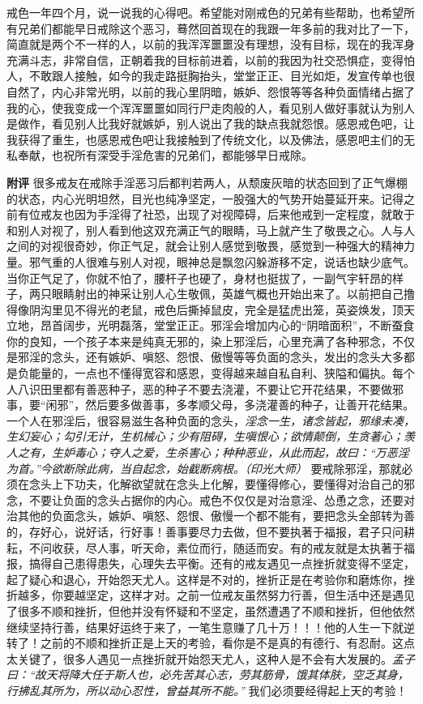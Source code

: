 \begin{case}
    戒色一年四个月，说一说我的心得吧。希望能对刚戒色的兄弟有些帮助，也希望所有兄弟们都能早日戒除这个恶习，蓦然回首现在的我跟一年多前的我对比了一下，简直就是两个不一样的人，以前的我浑浑噩噩没有理想，没有目标，现在的我浑身充满斗志，非常自信，正朝着我的目标前进着，以前的我因为社交恐惧症，变得怕人，不敢跟人接触，如今的我走路挺胸抬头，堂堂正正、目光如炬，发宣传单也很自然了，内心非常光明，以前的我心里阴暗，嫉妒、怨恨等等各种负面情绪占据了我的心，使我变成一个浑浑噩噩如同行尸走肉般的人，看见别人做好事就认为别人是做作，看见别人比我好就嫉妒，别人说出了我的缺点我就怨恨。感恩戒色吧，让我获得了重生，也感恩戒色吧让我接触到了传统文化，以及佛法，感恩吧主们的无私奉献，也祝所有深受手淫危害的兄弟们，都能够早日戒除。

    \textbf{附评} 很多戒友在戒除手淫恶习后都判若两人，从颓废灰暗的状态回到了正气爆棚的状态，内心光明坦然，目光也纯净坚定，一股强大的气势开始蔓延开来。记得之前有位戒友也因为手淫得了社恐，出现了对视障碍，后来他戒到一定程度，就敢于和别人对视了，别人看到他这双充满正气的眼睛，马上就产生了敬畏之心。人与人之间的对视很奇妙，你正气足，就会让别人感觉到敬畏，感觉到一种强大的精神力量。邪气重的人很难与别人对视，眼神总是飘忽闪躲游移不定，说话也缺少底气。当你正气足了，你就不怕了，腰杆子也硬了，身材也挺拔了，一副气宇轩昂的样子，两只眼睛射出的神采让别人心生敬佩，英雄气概也开始出来了。以前把自己撸得像阴沟里见不得光的老鼠，戒色后撕掉鼠皮，完全是猛虎出笼，英姿焕发，顶天立地，昂首阔步，光明磊落，堂堂正正。邪淫会增加内心的“阴暗面积”，不断蚕食你的良知，一个孩子本来是纯真无邪的，染上邪淫后，心里充满了各种邪念，不仅是邪淫的念头，还有嫉妒、嗔怒、怨恨、傲慢等等负面的念头，发出的念头大多都是负能量的，一点也不懂得宽容和感恩，变得越来越自私自利、狭隘和偏执。每个人八识田里都有善恶种子，恶的种子不要去浇灌，不要让它开花结果，不要做邪事，要“闲邪”，然后要多做善事，多孝顺父母，多浇灌善的种子，让善开花结果。一个人在邪淫后，很容易滋生各种负面的念头，\textit{淫念一生，诸念皆起，邪缘未凑，生幻妄心；勾引无计，生机械心；少有阻碍，生嗔恨心；欲情颠倒，生贪著心；羡人之有，生妒毒心；夺人之爱，生杀害心；种种恶业，从此而起，故曰：“万恶淫为首。”今欲断除此病，当自起念，始截断病根。（印光大师）} 要戒除邪淫，那就必须在念头上下功夫，化解欲望就在念头上化解，要懂得修心，要懂得对治自己的邪念，不要让负面的念头占据你的内心。戒色不仅仅是对治意淫、怂恿之念，还要对治其他的负面念头，嫉妒、嗔怒、怨恨、傲慢一个都不能有，要把念头全部转为善的，存好心，说好话，行好事！善事要尽力去做，但不要执著于福报，君子只问耕耘，不问收获，尽人事，听天命，素位而行，随适而安。有的戒友就是太执著于福报，搞得自己患得患失，心理失去平衡。还有的戒友遇见一点挫折就变得不坚定，起了疑心和退心，开始怨天尤人。这样是不对的，挫折正是在考验你和磨炼你，挫折越多，你要越坚定，这样才对。之前一位戒友虽然努力行善，但生活中还是遇见了很多不顺和挫折，但他并没有怀疑和不坚定，虽然遭遇了不顺和挫折，但他依然继续坚持行善，结果好运终于来了，一笔生意赚了几十万！！！他的人生一下就逆转了！之前的不顺和挫折正是上天的考验，看你是不是真的有德行、有忍耐。这点太关键了，很多人遇见一点挫折就开始怨天尤人，这种人是不会有大发展的。\textit{孟子曰：“故天将降大任于斯人也，必先苦其心志，劳其筋骨，饿其体肤，空乏其身，行拂乱其所为，所以动心忍性，曾益其所不能。”} 我们必须要经得起上天的考验！
\end{case}

